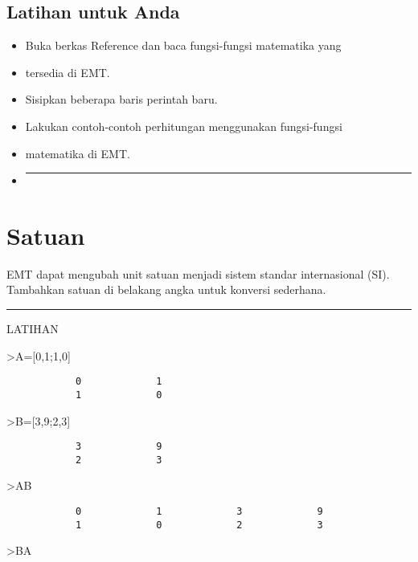 \documentclass[
]{book}
\begin{document}
\section{Latihan untuk Anda}\label{latihan-untuk-anda-1}

\begin{itemize}
\item
  Buka berkas Reference dan baca fungsi-fungsi matematika yang
\item
  tersedia di EMT.
\item
  Sisipkan beberapa baris perintah baru.
\item
  Lakukan contoh-contoh perhitungan menggunakan fungsi-fungsi
\item
  matematika di EMT.
\item
  \begin{center}\rule{0.5\linewidth}{0.5pt}\end{center}
\end{itemize}

\chapter{Satuan}\label{satuan}

EMT dapat mengubah unit satuan menjadi sistem standar internasional (SI). Tambahkan satuan di belakang angka untuk konversi sederhana.

\begin{center}\rule{0.5\linewidth}{0.5pt}\end{center}

LATIHAN

\textgreater A={[}0,1;1,0{]}

\begin{verbatim}
            0             1 
            1             0 
\end{verbatim}

\textgreater B={[}3,9;2,3{]}

\begin{verbatim}
            3             9 
            2             3 
\end{verbatim}

\textgreater A\textbar B

\begin{verbatim}
            0             1             3             9 
            1             0             2             3 
\end{verbatim}

\textgreater B\textbar A
\end{document}
